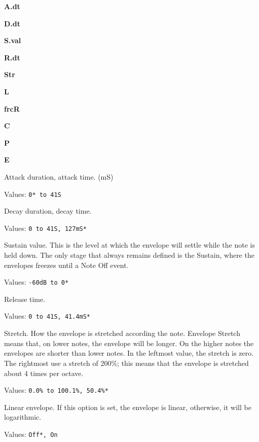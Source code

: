    \begin{enumber}
      \item \textbf{A.dt}
      \item \textbf{D.dt}
      \item \textbf{S.val}
      \item \textbf{R.dt}
      \item \textbf{Str}
      \item \textbf{L}
      \item \textbf{frcR}
      \item \textbf{C}
      \item \textbf{P}
      \item \textbf{E}
   \end{enumber}

   \setcounter{ItemCounter}{0}      %

   Attack duration, attack time. (mS)

   Values: \texttt{0* to 41S}

   Decay duration, decay time.

   Values: \texttt{0 to 41S, 127mS*}

   Sustain value.
   This is the level at which the envelope will settle while the note is held down.
   The only stage that always remains defined is the Sustain, where the
   envelopes freezes until a Note Off event.

   Values: \texttt{-60dB to 0*}

   Release time.

   Values: \texttt{0 to 41S, 41.4mS*}

   Stretch.
   How the envelope is stretched according the note.
   Envelope Stretch means that, on lower notes, the envelope will be longer.
   On the higher notes the envelopes are shorter than lower notes. In the
   leftmost value, the stretch is zero. The rightmost use a stretch of 200\%;
   this means that the envelope is stretched about 4 times per octave.

   Values: \texttt{0.0\% to 100.1\%, 50.4\%*}

   Linear envelope.
   If this option is set, the envelope is linear, otherwise, it will be
   logarithmic.

   Values: \texttt{Off*, On}

